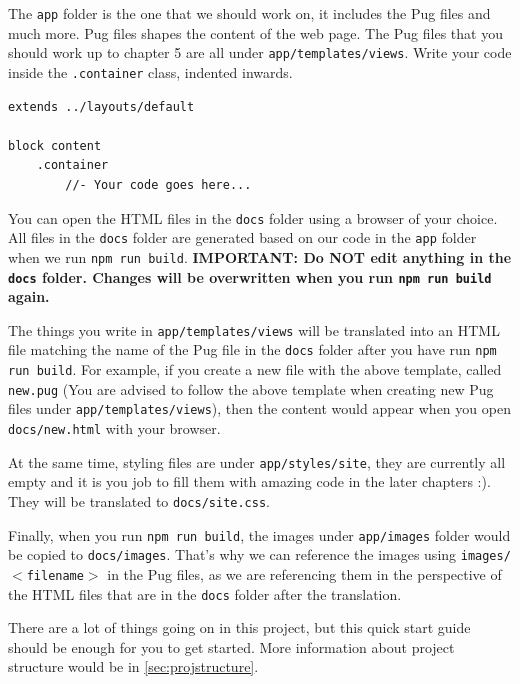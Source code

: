 The \texttt{app} folder is the one that we should work on, it includes the Pug files and much more. Pug files shapes the content of the web page. The Pug files that you should work up to chapter 5 are all under \texttt{app/templates/views}. Write your code inside the \texttt{.container} class, indented inwards. 
\vspace{6mm}

\begin{lstlisting}[language=pug]
extends ../layouts/default

block content
	.container
		//- Your code goes here...
\end{lstlisting}
\vspace{6mm}

You can open the HTML files in the \texttt{docs} folder using a browser of your choice. All files in the \texttt{docs} folder are generated based on our code in the \texttt{app} folder when we run \texttt{npm run build}. \textbf{IMPORTANT: Do NOT edit anything in the \texttt{docs} folder. Changes will be overwritten when you run \texttt{npm run build} again.}

The things you write in \texttt{app/templates/views} will be translated into an HTML file matching the name of the Pug file in the \texttt{docs} folder after you have run \texttt{npm run build}. For example, if you create a new file with the above template, called \texttt{new.pug} (You are advised to follow the above template when creating new Pug files under \texttt{app/templates/views}), then the content would appear when you open \texttt{docs/new.html} with your browser. 
\vspace{6mm}

At the same time, styling files are under \texttt{app/styles/site}, they are currently all empty and it is you job to fill them with amazing code in the later chapters :). They will be translated to \texttt{docs/site.css}.
\vspace{6mm}

Finally, when you run \texttt{npm run build}, the images under \texttt{app/images} folder would be copied to \texttt{docs/images}. That's why we can reference the images using \texttt{images/$<$filename$>$} in the Pug files, as we are referencing them in the perspective of the HTML files that are in the \texttt{docs} folder after the translation. 
\vspace{6mm}

There are a lot of things going on in this project, but this quick start guide should be enough for you to get started. More information about project structure would be in \cref{sec:projstructure}.

